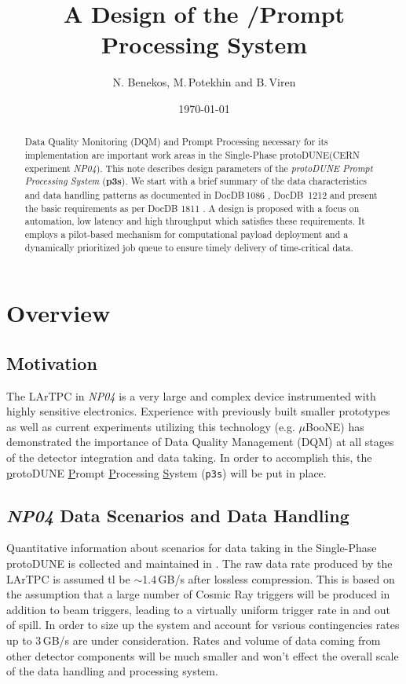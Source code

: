 \documentclass[pdftex,12pt,letter]{article}
\title{A Design of the \pd/\expname Prompt Processing System}
\date{\today}
\author{N. Benekos, M.\,Potekhin and B.\,Viren}
\newcommand{\pd}{protoDUNE\xspace}
\newcommand{\expname}{\textit{NP04}\xspace}
\newcommand{\PP}{Prompt Processing\xspace}
\begin{document}
\maketitle

\begin{abstract}
\noindent  Data Quality Monitoring (DQM) and \PP necessary for its implementation
are important work areas  in the Single-Phase \pd (CERN experiment \expname).
This note describes design parameters of the \textit{\pd Prompt Processing System} (\textbf{p3s}).
 We start with a brief summary of the data characteristics
and data handling patterns as documented in DocDB\,1086 \cite{docdb1086}, DocDB\,
1212 \cite{docdb1212} and present the basic requirements as per  DocDB 1811 \cite{docdb1811}.
A design is proposed with a focus on automation, low latency and high throughput which
satisfies these requirements. It employs a pilot-based mechanism for computational payload
deployment and a dynamically prioritized job queue to ensure timely delivery of time-critical data.
\end{abstract}


\section{Overview}
\subsection{Motivation}
The LArTPC in \expname is a very large and complex device instrumented with highly sensitive electronics.
Experience with previously built smaller prototypes as well as current experiments utilizing this technology
(e.g. $\mu$BooNE) has demonstrated the importance of Data Quality Management (DQM) at all stages of
the detector integration and data taking. In order to accomplish this, the \underline{p}rotoDUNE
\underline{P}rompt \underline{P}rocessing \underline{S}ystem (\texttt{p3s}) will be put in place.

\subsection{\expname Data Scenarios and Data Handling}
\label{sec:rawdata}
Quantitative information about scenarios for data taking in the Single-Phase \pd is collected and maintained in \cite{docdb1086}.
The raw data rate produced by the LArTPC is assumed tl be $\sim$1.4\,GB/s after lossless compression. This is based on
the assumption that a large number of Cosmic Ray triggers will be produced in addition to beam triggers, leading
to a virtually uniform trigger rate in and out of spill. In order to size up
the system and account for vsrious contingencies rates up to 3\,GB/s are under consideration.
Rates and volume of data coming from other detector components will be much smaller
and won't effect the overall scale of the data handling and processing system.
\end{document}
